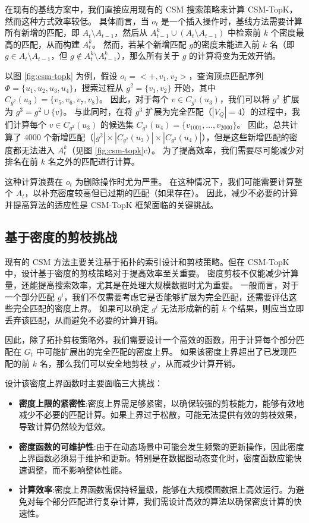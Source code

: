 在现有的基线方案中，我们直接应用现有的 CSM 搜索策略来计算 CSM-TopK，然而这种方式效率较低。
具体而言，当 $o_t$ 是一个插入操作时，基线方法需要计算所有新增的匹配，即 $A_{t} \setminus A_{t-1}$，然后从 $A_{t-1}^k \cup (A_{t} \setminus A_{t-1})$ 中检索前 $k$ 个密度最高的匹配，从而构建 $A_t^k$。
然而，若某个新增匹配 $g$的密度未能进入前 $k$ 名（即 $g \in A_{t} \setminus A_{t-1}$，但 $g \notin A_{t}^k \setminus A_{t-1}^k$），那么所有关于 $g$ 的计算将变为无效开销。

以图 \ref{fig:csm-topk} 为例，假设 $o_t = <+, v_1, v_2>$，查询顶点匹配序列 $\Phi = \{u_1, u_2, u_3, u_4\}$，搜索过程从 $g^2 = \{v_1, v_2\}$ 开始，其中 $C_{g^{2}}(u_{3}) = \{v_5, v_6, v_7, v_8\}$。
因此，对于每个 $v \in C_{g^{2}}(u_{3})$，我们可以将 $g^2$ 扩展为 $g^3 = g^2 \cup \{v\}$。
与此同时，在将 $g^3$ 扩展为完全匹配（$|V_Q| = 4$）的过程中，我们计算每个 $v \in C_{g^{2}}(u_{3})$ 的候选集 $C_{g^{3}}(u_{4}) = \{v_{1001}, \dots, v_{2000}\}$。
因此，总共计算了 $4000$ 个新增匹配（$|g^2| \times |C_{g^{2}}(u_{3})| \times |C_{g^{3}}(u_{4})|$），但是这些新增匹配的密度都无法进入 $A^k_t$（见图 \ref{fig:csm-topk}c）。
为了提高效率，我们需要尽可能减少对排名在前 $k$ 名之外的匹配进行计算。


这种计算浪费在 $o_t$ 为删除操作时尤为严重。
在这种情况下，我们可能需要计算整个 $A_{t}$，以补充密度较高但已过期的匹配（如果存在）。
因此，减少不必要的计算并提高算法的适应性是 CSM-TopK 框架面临的关键挑战。


\subsection{基于密度的剪枝挑战}

现有的 CSM 方法主要关注基于拓扑的索引设计和剪枝策略。但在 CSM-TopK 中，设计基于密度的剪枝策略对于提高效率至关重要。
密度剪枝不仅能减少计算量，还能提高搜索效率，尤其是在处理大规模数据时尤为重要。
一般而言，对于一个部分匹配 $g^i$，我们不仅需要考虑它是否能够扩展为完全匹配，还需要评估这些完全匹配的密度上界。
如果可以确定 $g^i$ 无法形成新的前 $k$ 个结果，则应当立即丢弃该匹配，从而避免不必要的计算开销。

因此，除了拓扑剪枝策略外，我们需要设计一个高效的函数，用于计算每个部分匹配在 $G_t$ 中可能扩展出的完全匹配的密度上界。
如果该密度上界超出了已发现匹配的前 $k$ 名，那么我们可以安全地剪枝 $g^i$，从而减少计算开销。

设计该密度上界函数时主要面临三大挑战：

\begin{itemize}
    \item \textbf{密度上限的紧密性}:密度上界需足够紧密，以确保较强的剪枝能力，能够有效地减少不必要的匹配计算。如果上界过于松散，可能无法提供有效的剪枝效果，导致计算仍然较为低效。
    \item \textbf{密度函数的可维护性}:由于在动态场景中可能会发生频繁的更新操作，因此密度上界函数必须易于维护和更新。特别是在数据图动态变化时，密度函数应能快速调整，而不影响整体性能。
    \item \textbf{计算效率}:密度上界函数需保持轻量级，能够在大规模图数据上高效运行。为避免对每个部分匹配进行复杂计算，我们需设计高效的算法以确保密度计算的快速性。
\end{itemize}   

